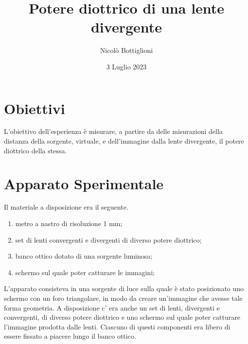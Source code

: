 \documentclass{article}
\title{Potere diottrico di una lente divergente}
\begin{document}
	\author{Nicolò Bottiglioni}
	\date{3 Luglio 2023}
	\maketitle
	\section{Obiettivi}
	L'obiettivo dell'esperienza è misurare, a partire da delle misurazioni della distanza della sorgente, virtuale, e dell'immagine dalla lente divergente, il potere diottrico della stessa.
	\section{Apparato Sperimentale}
	Il materiale a disposizione era il seguente.
	\begin{enumerate}
		\item metro a nastro di risoluzione 1 mm;
		\item set di lenti convergenti e divergenti di diverso potere diottrico;
		\item banco ottico dotato di una sorgente luminosa;
		\item schermo sul quale poter catturare le immagini;
	\end{enumerate}
	\vspace*{1em}
	L’apparato consisteva in una sorgente di luce sulla quale è stato posizionato uno schermo con un foro triangolare, in
	modo da creare un’immagine che avesse tale forma geometria. A disposizione c’ era anche un set di lenti,
	divergenti e convergenti, di diverso potere diottrico e uno schermo sul quale poter catturare l’immagine prodotta
	dalle lenti. Ciascuno di questi componenti era libero di essere fissato a piacere lungo il banco ottico.
	
\end{document}
